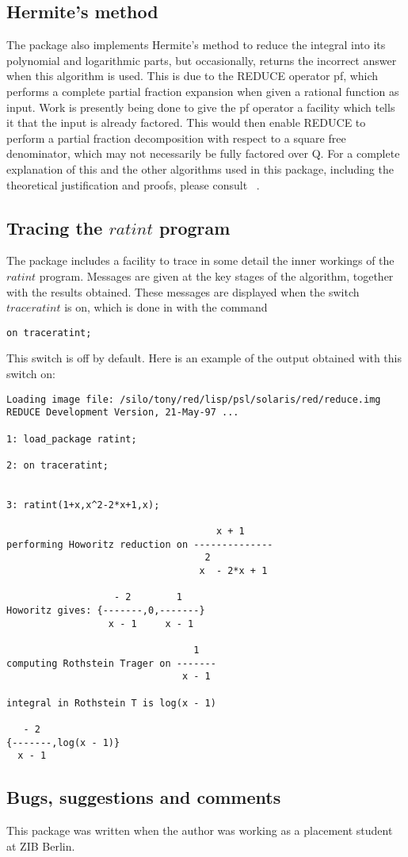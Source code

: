 \subsection{Hermite's method}
The package also implements Hermite's method to reduce the integral into its polynomial and logarithmic parts, but occasionally, \REDUCE returns the incorrect answer when this algorithm is used. This is due to the REDUCE operator pf, which performs a complete partial fraction expansion when given a rational function as input. Work is presently being done to give the pf operator a facility which tells it that the input is already factored. This would then enable REDUCE to perform a partial fraction decomposition with respect to a square free denominator, which may not necessarily be fully factored over Q. 
\newline
For a complete explanation of this and the other algorithms used in this package, including the theoretical justification and proofs, please consult ~\cite{Ged92}.

\subsection{Tracing the $ratint$ program}
The package includes a facility to trace in some detail the inner workings of the $ratint$ program. Messages are given at the key stages of the algorithm, together with the results obtained. These messages are displayed when the switch $traceratint$ is on, which is done in \REDUCE with the command 
\begin{verbatim}
on traceratint;
\end{verbatim}
This switch is off by default. Here is an example of the output obtained with this switch on:

\begin{verbatim}
Loading image file: /silo/tony/red/lisp/psl/solaris/red/reduce.img
REDUCE Development Version, 21-May-97 ...

1: load_package ratint;

2: on traceratint;


3: ratint(1+x,x^2-2*x+1,x);

                                     x + 1
performing Howoritz reduction on --------------
                                   2
                                  x  - 2*x + 1

                   - 2        1
Howoritz gives: {-------,0,-------}
                  x - 1     x - 1

                                 1
computing Rothstein Trager on -------
                               x - 1

integral in Rothstein T is log(x - 1)

   - 2
{-------,log(x - 1)}
  x - 1

\end{verbatim}

\subsection{Bugs, suggestions and comments}
This package was written when the author was working as a placement student at ZIB Berlin.

